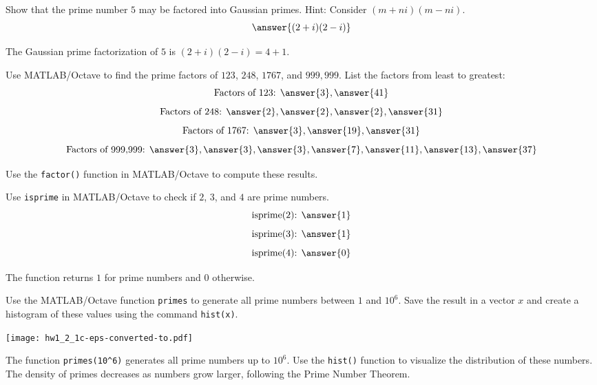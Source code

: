 \documentclass{ximera}
\author{Jont Allen}
\begin{document}
\begin{problem}
    Show that the prime number \(5\) may be factored into Gaussian primes. Hint: Consider \((m + ni)(m - ni)\).
    \[
    \answer{(2 + i)(2 - i)}
    \]
    \begin{feedback}[correct]
    The Gaussian prime factorization of \(5\) is \((2 + i)(2 - i) = 4 + 1\).
    \end{feedback}
\end{problem}

\begin{problem}
    Use MATLAB/Octave to find the prime factors of \(123\), \(248\), \(1767\), and \(999,999\). List the factors from least to greatest:
    \[
    \text{Factors of 123: } \answer{3}, \answer{41}
    \]
    \[
    \text{Factors of 248: } \answer{2}, \answer{2}, \answer{2}, \answer{31}
    \]
    \[
    \text{Factors of 1767: } \answer{3}, \answer{19}, \answer{31}
    \]
    \[
    \text{Factors of 999,999: } \answer{3}, \answer{3}, \answer{3}, \answer{7}, \answer{11}, \answer{13}, \answer{37}
    \]
    \begin{feedback}[correct]
    Use the \texttt{factor()} function in MATLAB/Octave to compute these results.
    \end{feedback}
\end{problem}

\begin{problem}
    Use \texttt{isprime} in MATLAB/Octave to check if \(2\), \(3\), and \(4\) are prime numbers.
    \[
    \text{isprime(2): } \answer{1}
    \]
    \[
    \text{isprime(3): } \answer{1}
    \]
    \[
    \text{isprime(4): } \answer{0}
    \]
    \begin{feedback}[correct]
    The function returns \(1\) for prime numbers and \(0\) otherwise.
    \end{feedback}
\end{problem}

\begin{problem}
    Use the MATLAB/Octave function \texttt{primes} to generate all prime numbers between \(1\) and \(10^6\).
    Save the result in a vector \(x\) and create a histogram of these values using the command \texttt{hist(x)}.
    \begin{multipleChoice}
    \end{multipleChoice}
    \begin{feedback}[correct]
    \begin{center}
        \texttt{[image: hw1\_2\_1c-eps-converted-to.pdf]}
    \end{center}
    The function \texttt{primes(10^6)} generates all prime numbers up to \(10^6\). Use the \texttt{hist()} function to visualize the distribution of these numbers. The density of primes decreases as numbers grow larger, following the Prime Number Theorem.
    \end{feedback}
\end{problem}
\end{document}
